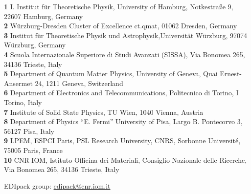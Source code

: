 \documentclass[dvipsnames]{SciPost}
\begin{document}
\begin{center}
  \newcommand{\CNRIOM}{CNR-IOM, Istituto Officina dei Materiali,
  Consiglio Nazionale delle Ricerche, Via Bonomea 265, 34136
  Trieste, Italy}
\newcommand{\SISSA}{Scuola Internazionale Superiore di Studi Avanzati (SISSA),
  Via Bonomea 265, 34136 Trieste, Italy}
\newcommand{\ITPHamburg}{I. Institut f\"ur Theoretische Physik,
  University of Hamburg, Notkestra\ss e 9, 22607 Hamburg, Germany}
\newcommand{\WZBURG}{Institut f\"ur Theoretische Physik und
  Astrophysik,Universit\"at W\"urzburg, 97074 W\"urzburg, Germany}
\newcommand{\CTQMAT}{W\"urzburg-Dresden Cluster of Excellence ct.qmat, 01062 Dresden, Germany}
\newcommand{\Geneve}{Department of Quantum Matter Physics, University of
  Geneva, Quai Ernest-Ansermet 24, 1211 Geneva, Switzerland}
\newcommand{\UPISA}{Department of Physics ``E. Fermi'' University of
  Pisa, Largo B. Pontecorvo 3, 56127 Pisa, Italy}
\newcommand{\ESPCI}{LPEM, ESPCI Paris, PSL Research University, CNRS, Sorbonne Universit\'e, 75005 Paris, France}
\newcommand{\TUW}{Institute of Solid State Physics, TU Wien, 1040 Vienna, Austria}
\newcommand{\ToPoli}{Department of Electronics and Telecommunications, Politecnico di Torino, I\-10129 Torino, Italy}
{\bf 1} \ITPHamburg\\
{\bf 2} \CTQMAT\\
{\bf 3} \WZBURG\\
{\bf 4} \SISSA\\
{\bf 5} \Geneve\\
{\bf 6} \ToPoli\\
{\bf 7} \TUW\\   
{\bf 8} \UPISA\\
{\bf 9} \ESPCI\\
{\bf 10} \CNRIOM\\
\end{center}



\begin{center}
\vspace{\baselineskip}
EDIpack group: \href{mailto:edipack@cnr.iom.it}{\small edipack@cnr.iom.it}
\end{center}



\end{document}
